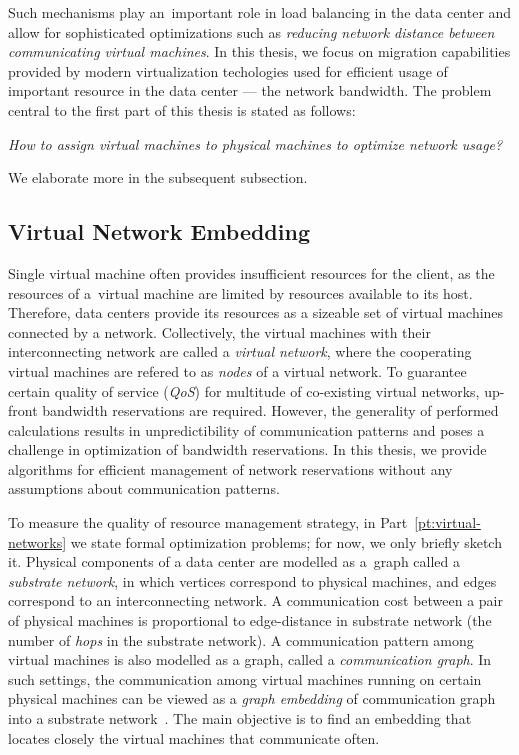 Such mechanisms play an~important role in load balancing in the data center and allow for sophisticated optimizations such as \emph{reducing network distance between communicating virtual machines}.
In this thesis, we focus on migration capabilities provided by modern virtualization techologies used for efficient usage of important resource in the data center --- the network bandwidth.
The problem central to the first part of this thesis is stated as follows:

\begin{center}
  \emph{How to assign virtual machines to physical machines to optimize network
  usage?}
\end{center}
We elaborate more in the subsequent subsection.

\subsection{Virtual Network Embedding}

Single virtual machine often provides insufficient resources for the client, as the resources of a~virtual machine are limited by resources available to its host.
Therefore, data centers provide its resources as a sizeable set of virtual machines connected by a network.
Collectively, the virtual machines with their interconnecting network are called a \emph{virtual network}, where the cooperating virtual machines are refered to as \emph{nodes} of a virtual network.
To guarantee certain quality of service (\emph{QoS}) for multitude of co-existing virtual networks, up-front bandwidth reservations are required.
However, the generality of performed calculations results in unpredictibility of communication patterns and poses a challenge in optimization of bandwidth reservations.
In this thesis, we provide algorithms for efficient management of network reservations without any assumptions about communication patterns.

To measure the quality of resource management strategy, in Part~\ref{pt:virtual-networks} we state formal optimization problems; for now, we only briefly sketch it.
Physical components of a data center are modelled as a~graph called a \emph{substrate network}, in which vertices correspond to physical machines, and edges correspond to an interconnecting network.
A communication cost between a pair of physical machines is proportional to edge-distance in substrate network (the number of \emph{hops} in the substrate network).
A communication pattern among virtual machines is also modelled as a graph, called a \emph{communication graph}.
In such settings, the communication among virtual machines running on certain physical machines can be viewed as a \emph{graph embedding} of communication graph into a substrate network~\cite{Goyal2008,gupta2001provisioning}.
The main objective is to find an embedding that locates closely the virtual machines that communicate often.

